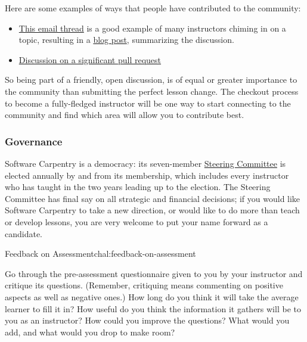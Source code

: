 Here are some examples of ways that people have contributed to the
community:

\begin{itemize}
\item
  \href{http://lists.software-carpentry.org/pipermail/discuss/2015-October/003396.html}{This
  email thread} is a good example of many instructors chiming in on a
  topic, resulting in a
  \href{http://software-carpentry.org/blog/2015/10/pulling-along-those-behind.html}{blog
  post}, summarizing the discussion.
\item
  \href{https://github.com/swcarpentry/r-novice-gapminder/pull/89}{Discussion
  on a significant pull request}
\end{itemize}

So being part of a friendly, open discussion, is of equal or greater
importance to the community than submitting the perfect lesson change.
The checkout process to
become a fully-fledged instructor will be one way to start connecting to
the community and find which area will allow you to contribute best.

\subsubsection{Governance}\label{governance}

Software Carpentry is a democracy: its seven-member
\href{http://software-carpentry.org/scf/}{Steering Committee} is elected
annually by and from its membership, which includes every instructor who
has taught in the two years leading up to the election. The Steering
Committee has final say on all strategic and financial decisions; if you
would like Software Carpentry to take a new direction, or would like to
do more than teach or develop lessons, you are very welcome to put your
name forward as a candidate.

\begin{challenge}{Feedback on Assessment}{chal:feedback-on-assessment}

Go through the pre-assessment questionnaire given to you by your
instructor and critique its questions. (Remember, critiquing means
commenting on positive aspects as well as negative ones.) How long do
you think it will take the average learner to fill it in? How useful do
you think the information it gathers will be to you as an instructor?
How could you improve the questions? What would you add, and what would
you drop to make room?
\end{challenge}

